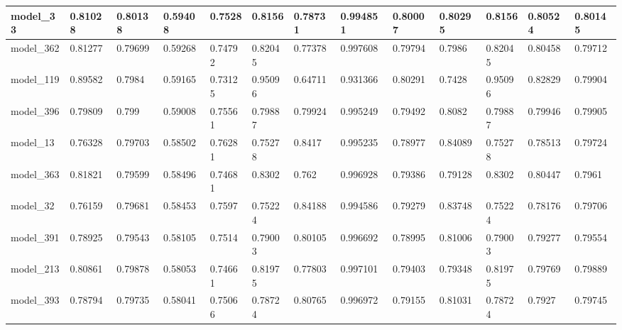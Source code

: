 \begin{tabular}{|l|l|l|l|l|l|l|l|l|l|l|l|l|}
model\_33      & 0.81028     & 0.80138        & 0.59408      & 0.7528           & 0.8156               & 0.78731              & 0.994851     & 0.80007           & 0.80295            & 0.8156          & 0.80524     & 0.80145      \\ \hline
model\_362     & 0.81277     & 0.79699        & 0.59268      & 0.74792          & 0.82045              & 0.77378              & 0.997608     & 0.79794           & 0.7986             & 0.82045         & 0.80458     & 0.79712      \\ \hline
model\_119     & 0.89582     & 0.7984         & 0.59165      & 0.73125          & 0.95096              & 0.64711              & 0.931366     & 0.80291           & 0.7428             & 0.95096         & 0.82829     & 0.79904      \\ \hline
model\_396     & 0.79809     & 0.799          & 0.59008      & 0.75561          & 0.79887              & 0.79924              & 0.995249     & 0.79492           & 0.8082             & 0.79887         & 0.79946     & 0.79905      \\ \hline
model\_13      & 0.76328     & 0.79703        & 0.58502      & 0.76281          & 0.75278              & 0.8417               & 0.995235     & 0.78977           & 0.84089            & 0.75278         & 0.78513     & 0.79724      \\ \hline
model\_363     & 0.81821     & 0.79599        & 0.58496      & 0.74681          & 0.8302               & 0.762                & 0.996928     & 0.79386           & 0.79128            & 0.8302          & 0.80447     & 0.7961       \\ \hline
model\_32      & 0.76159     & 0.79681        & 0.58453      & 0.7597           & 0.75224              & 0.84188              & 0.994586     & 0.79279           & 0.83748            & 0.75224         & 0.78176     & 0.79706      \\ \hline
model\_391     & 0.78925     & 0.79543        & 0.58105      & 0.7514           & 0.79003              & 0.80105              & 0.996692     & 0.78995           & 0.81006            & 0.79003         & 0.79277     & 0.79554      \\ \hline
model\_213     & 0.80861     & 0.79878        & 0.58053      & 0.74661          & 0.81975              & 0.77803              & 0.997101     & 0.79403           & 0.79348            & 0.81975         & 0.79769     & 0.79889      \\ \hline
model\_393     & 0.78794     & 0.79735        & 0.58041      & 0.75066          & 0.78724              & 0.80765              & 0.996972     & 0.79155           & 0.81031            & 0.78724         & 0.7927      & 0.79745      \\ \hline

\end{tabular}
